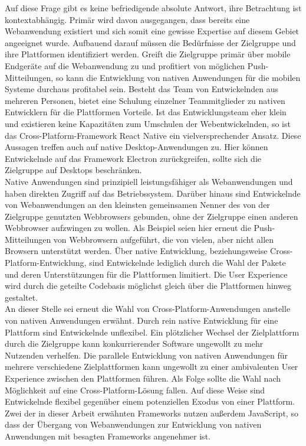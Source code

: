 \documentclass[a4paper]{scrartcl}
\begin{document}
Auf diese Frage gibt es keine befriedigende absolute Antwort, ihre Betrachtung ist kontextabhängig. Primär wird davon ausgegangen, dass bereits eine Webanwendung existiert und sich somit eine gewisse Expertise auf diesem Gebiet angeeignet wurde. Aufbauend darauf müssen die Bedürfnisse der Zielgruppe und ihre Plattformen identifiziert werden. Greift die Zielgruppe primär über mobile Endgeräte auf die Webanwendung zu und profitiert von möglichen Push-Mitteilungen, so kann die Entwicklung von nativen Anwendungen für die mobilen Systeme durchaus profitabel sein. Besteht das Team von Entwickelnden aus mehreren Personen, bietet eine Schulung einzelner Teammitglieder zu nativen Entwicklern für die Plattformen Vorteile. Ist das Entwicklungsteam eher klein und existieren keine Kapazitäten zum Umschulen der Webentwickelnden, so ist das Cross-Platform-Framework React Native ein vielversprechender Ansatz. Diese Aussagen treffen auch auf native Desktop-Anwendungen zu. Hier können Entwickelnde auf das Framework Electron zurückgreifen, sollte sich die Zielgruppe auf Desktops beschränken. \\
Native Anwendungen sind prinzipiell leistungsfähiger als Webanwendungen und haben direkten Zugriff auf das Betriebssystem. Darüber hinaus sind Entwickelnde von Webanwendungen an den kleinsten gemeinsamen Nenner des von der Zielgruppe genutzten Webbrowsers gebunden, ohne der Zielgruppe einen anderen Webbrowser aufzwingen zu wollen. Als Beispiel seien hier erneut die Push-Mitteilungen von Webbrowsern aufgeführt, die von vielen, aber nicht allen Browsern unterstützt werden. Über native Entwicklung, beziehungsweise Cross-Platform-Entwicklung, sind Entwickelnde lediglich durch die Wahl der Pakete und deren Unterstützungen für die Plattformen limitiert. Die User Experience wird durch die geteilte Codebasis möglichst gleich über die Plattformen hinweg gestaltet. \\
An dieser Stelle sei erneut die Wahl von Cross-Platform-Anwendungen anstelle von nativen Anwendungen erwähnt. Durch rein native Entwicklung für eine Plattform sind Entwickelnde unflexibel. Ein plötzlicher Wechsel der Zielplattform durch die Zielgruppe kann konkurrierender Software ungewollt zu mehr Nutzenden verhelfen. Die parallele Entwicklung von nativen Anwendungen für mehrere verschiedene Zielplattformen kann ungewollt zu einer ambivalenten User Experience zwischen den Plattformen führen. Als Folge sollte die Wahl nach Möglichkeit auf eine Cross-Platform-Lösung fallen. Auf diese Weise sind Entwickelnde flexibel gegenüber einem potenziellen Exodus von einer Plattform. Zwei der in dieser Arbeit erwähnten Frameworks nutzen außerdem JavaScript, so dass der Übergang von Webanwendungen zur Entwicklung von nativen Anwendungen mit besagten Frameworks angenehmer ist. \\
\end{document}
